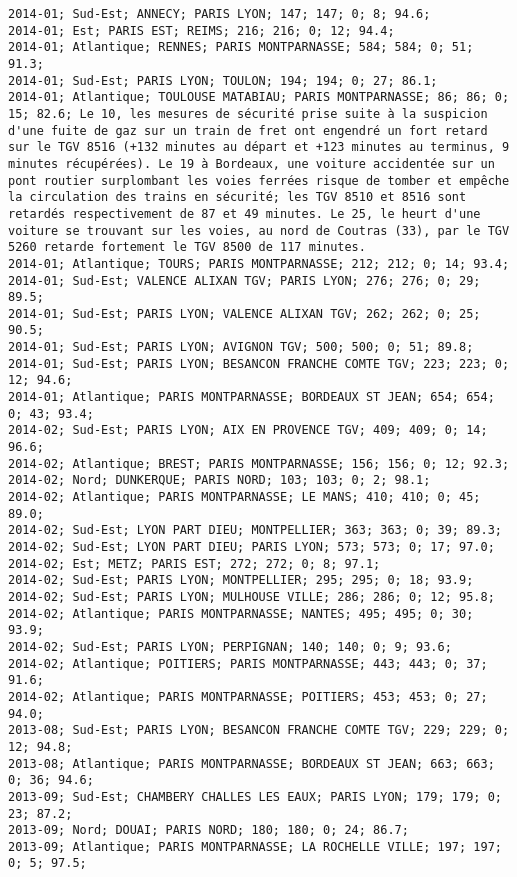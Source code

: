 \documentclass{article}
\begin{document}
\begin{Verbatim}[commandchars=\\\{\}]
2014-01; Sud-Est; ANNECY; PARIS LYON; 147; 147; 0; 8; 94.6; 
2014-01; Est; PARIS EST; REIMS; 216; 216; 0; 12; 94.4; 
2014-01; Atlantique; RENNES; PARIS MONTPARNASSE; 584; 584; 0; 51; 91.3; 
2014-01; Sud-Est; PARIS LYON; TOULON; 194; 194; 0; 27; 86.1; 
2014-01; Atlantique; TOULOUSE MATABIAU; PARIS MONTPARNASSE; 86; 86; 0; 15; 82.6; Le 10, les mesures de sécurité prise suite à la suspicion d'une fuite de gaz sur un train de fret ont engendré un fort retard sur le TGV 8516 (+132 minutes au départ et +123 minutes au terminus, 9 minutes récupérées). Le 19 à Bordeaux, une voiture accidentée sur un pont routier surplombant les voies ferrées risque de tomber et empêche la circulation des trains en sécurité; les TGV 8510 et 8516 sont retardés respectivement de 87 et 49 minutes. Le 25, le heurt d'une voiture se trouvant sur les voies, au nord de Coutras (33), par le TGV 5260 retarde fortement le TGV 8500 de 117 minutes.
2014-01; Atlantique; TOURS; PARIS MONTPARNASSE; 212; 212; 0; 14; 93.4; 
2014-01; Sud-Est; VALENCE ALIXAN TGV; PARIS LYON; 276; 276; 0; 29; 89.5; 
2014-01; Sud-Est; PARIS LYON; VALENCE ALIXAN TGV; 262; 262; 0; 25; 90.5; 
2014-01; Sud-Est; PARIS LYON; AVIGNON TGV; 500; 500; 0; 51; 89.8; 
2014-01; Sud-Est; PARIS LYON; BESANCON FRANCHE COMTE TGV; 223; 223; 0; 12; 94.6; 
2014-01; Atlantique; PARIS MONTPARNASSE; BORDEAUX ST JEAN; 654; 654; 0; 43; 93.4; 
2014-02; Sud-Est; PARIS LYON; AIX EN PROVENCE TGV; 409; 409; 0; 14; 96.6; 
2014-02; Atlantique; BREST; PARIS MONTPARNASSE; 156; 156; 0; 12; 92.3; 
2014-02; Nord; DUNKERQUE; PARIS NORD; 103; 103; 0; 2; 98.1; 
2014-02; Atlantique; PARIS MONTPARNASSE; LE MANS; 410; 410; 0; 45; 89.0; 
2014-02; Sud-Est; LYON PART DIEU; MONTPELLIER; 363; 363; 0; 39; 89.3; 
2014-02; Sud-Est; LYON PART DIEU; PARIS LYON; 573; 573; 0; 17; 97.0; 
2014-02; Est; METZ; PARIS EST; 272; 272; 0; 8; 97.1; 
2014-02; Sud-Est; PARIS LYON; MONTPELLIER; 295; 295; 0; 18; 93.9; 
2014-02; Sud-Est; PARIS LYON; MULHOUSE VILLE; 286; 286; 0; 12; 95.8; 
2014-02; Atlantique; PARIS MONTPARNASSE; NANTES; 495; 495; 0; 30; 93.9; 
2014-02; Sud-Est; PARIS LYON; PERPIGNAN; 140; 140; 0; 9; 93.6; 
2014-02; Atlantique; POITIERS; PARIS MONTPARNASSE; 443; 443; 0; 37; 91.6; 
2014-02; Atlantique; PARIS MONTPARNASSE; POITIERS; 453; 453; 0; 27; 94.0; 
2013-08; Sud-Est; PARIS LYON; BESANCON FRANCHE COMTE TGV; 229; 229; 0; 12; 94.8; 
2013-08; Atlantique; PARIS MONTPARNASSE; BORDEAUX ST JEAN; 663; 663; 0; 36; 94.6; 
2013-09; Sud-Est; CHAMBERY CHALLES LES EAUX; PARIS LYON; 179; 179; 0; 23; 87.2; 
2013-09; Nord; DOUAI; PARIS NORD; 180; 180; 0; 24; 86.7; 
2013-09; Atlantique; PARIS MONTPARNASSE; LA ROCHELLE VILLE; 197; 197; 0; 5; 97.5; 

\end{Verbatim}
\end{document}
